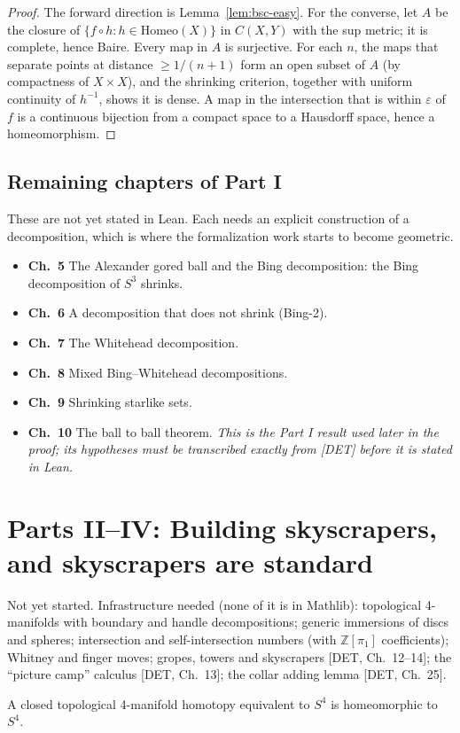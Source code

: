 \begin{proof}
  \leanok
  The forward direction is Lemma~\ref{lem:bsc-easy}. For the converse, let
  $A$ be the closure of $\{f\circ h : h\in\mathrm{Homeo}(X)\}$ in $C(X,Y)$ with
  the sup metric; it is complete, hence Baire. Every map in $A$ is surjective.
  For each $n$, the maps that separate points at distance $\ge 1/(n+1)$ form an
  open subset of $A$ (by compactness of $X\times X$), and the shrinking criterion,
  together with uniform continuity of $h^{-1}$, shows it is dense. A map in the
  intersection that is within $\varepsilon$ of $f$ is a continuous bijection
  from a compact space to a Hausdorff space, hence a homeomorphism.
\end{proof}

\section{Remaining chapters of Part I}

These are not yet stated in Lean. Each needs an explicit construction of a
decomposition, which is where the formalization work starts to become
geometric.

\begin{itemize}
  \item \textbf{Ch.~5} The Alexander gored ball and the Bing decomposition:
        the Bing decomposition of $S^3$ shrinks.
  \item \textbf{Ch.~6} A decomposition that does not shrink (Bing-2).
  \item \textbf{Ch.~7} The Whitehead decomposition.
  \item \textbf{Ch.~8} Mixed Bing--Whitehead decompositions.
  \item \textbf{Ch.~9} Shrinking starlike sets.
  \item \textbf{Ch.~10} The ball to ball theorem. \emph{This is the Part I
        result used later in the proof; its hypotheses must be transcribed
        exactly from [DET] before it is stated in Lean.}
\end{itemize}

\chapter{Parts II--IV: Building skyscrapers, and skyscrapers are standard}

Not yet started. Infrastructure needed (none of it is in Mathlib):
topological 4-manifolds with boundary and handle decompositions; generic
immersions of discs and spheres; intersection and self-intersection numbers
(with $\mathbb{Z}[\pi_1]$ coefficients); Whitney and finger moves; gropes,
towers and skyscrapers [DET, Ch.~12--14]; the ``picture camp'' calculus
[DET, Ch.~13]; the collar adding lemma [DET, Ch.~25].

\begin{theorem}
  \label{thm:poincare4}
  \leanok
  A closed topological 4-manifold homotopy equivalent to $S^4$ is homeomorphic
  to $S^4$.
\end{theorem}
